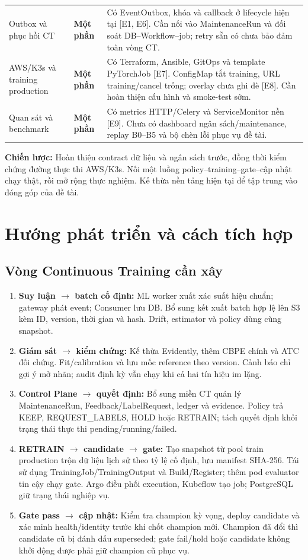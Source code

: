\documentclass[11pt,a4paper]{article}
\newcommand{\statuspartial}{\textcolor{orange!65!black}{\textbf{Một phần}}}
\begin{document}
\begin{longtable}{@{}L{3cm} L{1.7cm} L{\dimexpr\linewidth-4.7cm-4\tabcolsep\relax}@{}}
Outbox và phục hồi CT & \statuspartial & Có EventOutbox, khóa và callback ở lifecycle hiện tại [E1, E6]. Cần nối vào MaintenanceRun và đối soát DB--Workflow--job; retry sẵn có chưa bảo đảm toàn vòng CT.\\
AWS/K3s và training production & \statuspartial & Có Terraform, Ansible, GitOps và template PyTorchJob [E7]. ConfigMap tắt training, URL training/cancel trống; overlay chưa ghi đè [E8]. Cần hoàn thiện cấu hình và smoke-test sớm.\\
Quan sát và benchmark & \statuspartial & Có metrics HTTP/Celery và ServiceMonitor nền [E9]. Chưa có dashboard ngân sách/maintenance, replay B0--B5 và bộ chèn lỗi phục vụ đề tài.\\
\bottomrule
\end{longtable}

\textbf{Chiến lược:} Hoàn thiện contract dữ liệu và ngân sách trước, đồng thời kiểm chứng đường thực thi AWS/K3s. Nối một luồng policy--training--gate--cập nhật chạy thật, rồi mở rộng thực nghiệm. Kế thừa nền tảng hiện tại để tập trung vào đóng góp của đề tài.

\section{Hướng phát triển và cách tích hợp}
\subsection{Vòng Continuous Training cần xây}
\begin{enumerate}
  \item \textbf{Suy luận $\rightarrow$ batch cố định:} ML worker xuất xác suất hiệu chuẩn; gateway phát event; Consumer lưu DB. Bổ sung kết xuất batch hợp lệ lên S3 kèm ID, version, thời gian và hash. Drift, estimator và policy dùng cùng snapshot.
  \item \textbf{Giám sát $\rightarrow$ kiểm chứng:} Kế thừa Evidently, thêm CBPE chính và ATC đối chứng. Fit/calibration và lưu mốc reference theo version. Cảnh báo chỉ gợi ý mở nhãn; audit định kỳ vẫn chạy khi cả hai tín hiệu im lặng.
  \item \textbf{Control Plane $\rightarrow$ quyết định:} Bổ sung miền CT quản lý MaintenanceRun, Feedback/LabelRequest, ledger và evidence. Policy trả KEEP, REQUEST\_LABELS, HOLD hoặc RETRAIN; tách quyết định khỏi trạng thái thực thi pending/running/failed.
  \item \textbf{RETRAIN $\rightarrow$ candidate $\rightarrow$ gate:} Tạo snapshot từ pool train production trộn dữ liệu lịch sử theo tỷ lệ cố định, lưu manifest SHA-256. Tái sử dụng TrainingJob/TrainingOutput và Build/Register; thêm pod evaluator tin cậy chạy gate. Argo điều phối execution, Kubeflow tạo job; PostgreSQL giữ trạng thái nghiệp vụ.
  \item \textbf{Gate pass $\rightarrow$ cập nhật:} Kiểm tra champion kỳ vọng, deploy candidate và xác minh health/identity trước khi chốt champion mới. Champion đã đổi thì candidate cũ bị đánh dấu superseded; gate fail/hold hoặc candidate không khởi động được phải giữ champion cũ phục vụ.
\end{enumerate}
\end{document}
